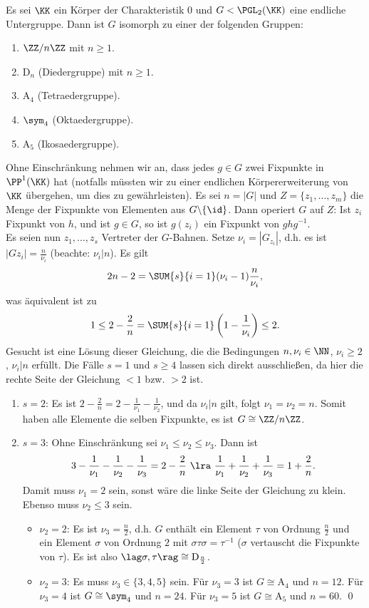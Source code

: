 \SATZ Es sei $\KK$ ein Körper der Charakteristik $0$ und
$G<\PGL_2(\KK)$ eine endliche Untergruppe.
Dann ist $G$ isomorph zu einer der folgenden Gruppen:
\begin{enumerate}
\item $\ZZ/n\ZZ$ mit $n\geq 1$.
\item $\mathrm{D}_n$ (Diedergruppe) mit $n\geq 1$.
\item $\mathrm{A}_4$ (Tetraedergruppe).
\item $\sym_4$ (Oktaedergruppe).
\item $\mathrm{A}_5$ (Ikosaedergruppe).
\end{enumerate}
\bew Ohne Einschränkung nehmen wir an, dass jedes $g\in G$ zwei
Fixpunkte in $\PP^1(\KK)$ hat (notfalls müssten wir zu einer
endlichen Körpererweiterung von $\KK$ übergehen, um dies zu
gewährleisten). Es sei $n=|G|$ und $Z=\{z_1,\ldots,z_m\}$
die Menge der Fixpunkte von Elementen aus $G\backslash\{\id\}$.
Dann operiert $G$ auf $Z$: Ist $z_i$ Fixpunkt von $h$, und ist
$g\in G$, so ist $g(z_i)$ ein Fixpunkt von $ghg^{-1}$.\\
Es seien nun $z_1,\ldots,z_s$ Vertreter der $G$-Bahnen.
Setze $\nu_i=|G_{z_i}|$, d.h. es ist $|G z_i|=\frac{n}{\nu_i}$
(beachte: $\nu_i|n$). Es gilt
\[
2n-2 = \SUM{s}{i=1}(\nu_i-1)\frac{n}{\nu_i},
\]
was äquivalent ist zu
\[
1\leq 2-\frac{2}{n} = \SUM{s}{i=1}\left(1-\frac{1}{\nu_i}\right)
\leq 2.
\]
Gesucht ist eine Lösung dieser Gleichung, die die Bedingungen
$n,\nu_i\in\NN$, $\nu_i\geq 2$, $\nu_i|n$ erfüllt.
Die Fälle $s=1$ und $s\geq 4$ lassen sich direkt ausschließen,
da hier die rechte Seite der Gleichung $<1$ bzw. $>2$ ist.
\begin{enumerate}
\item[]$s=2$: Es ist
$2-\frac{2}{n}=2-\frac{1}{\nu_1}-\frac{1}{\nu_2}$, und da $\nu_i|n$
gilt, folgt $\nu_1=\nu_2=n$. Somit haben alle Elemente die selben
Fixpunkte, es ist $G\cong\ZZ/n\ZZ$.
\item[]$s=3$: Ohne Einschränkung sei $\nu_1\leq\nu_2\leq\nu_3$.
Dann ist
\[
3-\frac{1}{\nu_1}-\frac{1}{\nu_2}-\frac{1}{\nu_3}=2-\frac{2}{n}
\ \lra\ 
\frac{1}{\nu_1}+\frac{1}{\nu_2}+\frac{1}{\nu_3}=1+\frac{2}{n}.
\]
Damit muss $\nu_1=2$ sein, sonst wäre die linke Seite der Gleichung
zu klein. Ebenso muss $\nu_2\leq 3$ sein.
\begin{itemize}
\item[]$\nu_2=2$: Es ist $\nu_3=\frac{n}{2}$, d.h. $G$ enthält
ein Element $\tau$ von Ordnung $\frac{n}{2}$ und ein Element
$\sigma$ von Ordnung $2$ mit $\sigma\tau\sigma=\tau^{-1}$
($\sigma$ vertauscht die Fixpunkte von $\tau$).
Es ist also $\lag\sigma,\tau\rag\cong\mathrm{D}_{\frac{n}{2}}$.
\item[] $\nu_2=3$: Es muss $\nu_3\in\{3,4,5\}$ sein.
Für $\nu_3=3$ ist $G\cong\mathrm{A}_4$ und $n=12$.
Für $\nu_3=4$ ist $G\cong\sym_4$ und $n=24$.
Für $\nu_3=5$ ist $G\cong\mathrm{A}_5$ und $n=60$.
\qed
\end{itemize}
\end{enumerate}


